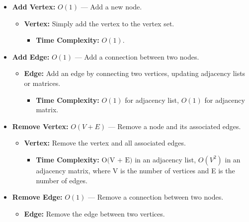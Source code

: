 \documentclass[
  letterpaper,
  DIV=11,
  numbers=noendperiod]{scrreprt}
\providecommand{\tightlist}{%
  \setlength{\itemsep}{0pt}\setlength{\parskip}{0pt}}
\begin{document}
\begin{itemize}
\tightlist
\item
  \textbf{Add Vertex:} \(O(1)\) --- Add a new node.

  \begin{itemize}
  \tightlist
  \item
    \textbf{Vertex:} Simply add the vertex to the vertex set.

    \begin{itemize}
    \tightlist
    \item
      \textbf{Time Complexity:} \(O(1)\).
    \end{itemize}
  \end{itemize}
\item
  \textbf{Add Edge:} \(O(1)\) --- Add a connection between two nodes.

  \begin{itemize}
  \tightlist
  \item
    \textbf{Edge:} Add an edge by connecting two vertices, updating
    adjacency lists or matrices.

    \begin{itemize}
    \tightlist
    \item
      \textbf{Time Complexity:} \(O(1)\) for adjacency list, \(O(1)\)
      for adjacency matrix.
    \end{itemize}
  \end{itemize}
\item
  \textbf{Remove Vertex:} \(O(V+E)\) --- Remove a node and its
  associated edges.

  \begin{itemize}
  \tightlist
  \item
    \textbf{Vertex:} Remove the vertex and all associated edges.

    \begin{itemize}
    \tightlist
    \item
      \textbf{Time Complexity:} \(\text{O(V + E)}\) in an adjacency
      list, \(O(V^2)\) in an adjacency matrix, where V is the number of
      vertices and E is the number of edges.
    \end{itemize}
  \end{itemize}
\item
  \textbf{Remove Edge:} \(O(1)\) --- Remove a connection between two
  nodes.

  \begin{itemize}
  \tightlist
  \item
    \textbf{Edge:} Remove the edge between two vertices.


\end{itemize}
\end{itemize}
\end{document}
